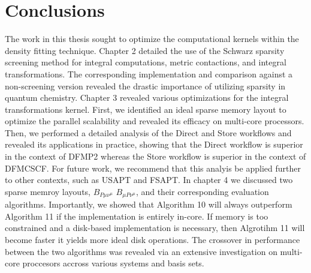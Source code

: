 \chapter{Conclusions}

The work in this thesis sought to optimize the computational kernels within the density fitting technique.
Chapter 2 detailed the use of the Schwarz sparsity screening method for integral computations, metric contactions, and integral transformations.
The corresponding implementation and comparison against a non-screening version revealed the drastic importance of 
utilizing sparsity in quantum chemistry.
Chapter 3 revealed various optimizations for the integral transformations kernel. First, we identified an ideal sparse memory layout to 
optimize the parallel scalability and revealed its efficacy on multi-core processors.  Then, we performed a detailed analysis of 
the Direct and Store workflows and revealed its applications in practice, showing that the Direct workflow is superior in 
the context of DFMP2 whereas the Store workflow is superior in the context of DFMCSCF. 
For future work, we recommend that this analyis be applied further to other contexts, such as
USAPT and FSAPT. In chapter 4 we discussed two sparse memroy layouts, $B_{P \mu \nu^{\mu}}$ $B_{\mu P \nu^{\mu}}$, and their corresponding
evaluation algorithms. Importantly, we showed that Algorithm 10 will always outperform Algorithm 11 if the implementation is entirely in-core.
If memory is too constrained and a disk-based implementation is necessary, then Algrotihm 11 will become faster 
it yields more ideal disk operations. The crossover in performance between the two algorithms was revealed via an extensive investigation on
multi-core proccesors accross various systems and basis sets.


